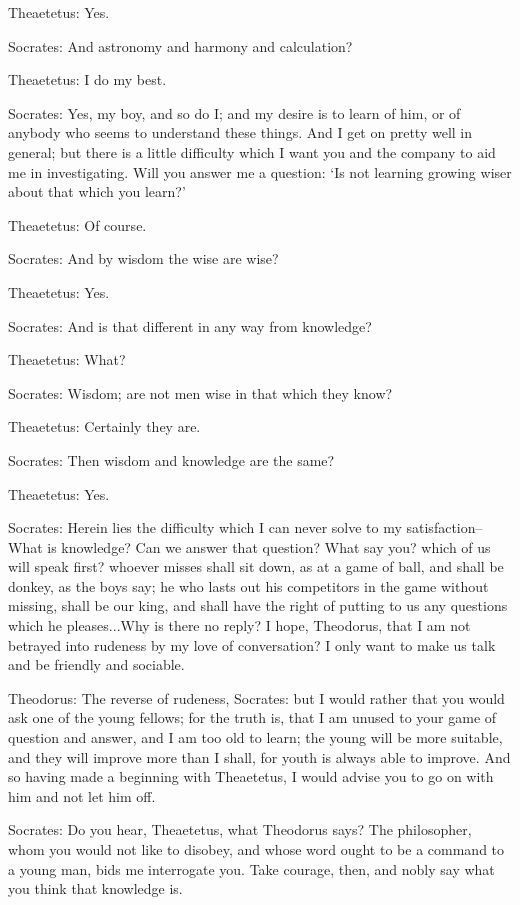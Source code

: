 Theaetetus: Yes.

Socrates: And astronomy and harmony and calculation?

Theaetetus: I do my best.

Socrates: Yes, my boy, and so do I; and my desire is to learn of him,
or of anybody who seems to understand these things. And I get on pretty
well in general; but there is a little difficulty which I want you and
the company to aid me in investigating. Will you answer me a question:
`Is not learning growing wiser about that which you learn?'

Theaetetus: Of course.

Socrates: And by wisdom the wise are wise?

Theaetetus: Yes.

Socrates: And is that different in any way from knowledge?

Theaetetus: What?

Socrates: Wisdom; are not men wise in that which they know?

Theaetetus: Certainly they are.

Socrates: Then wisdom and knowledge are the same?

Theaetetus: Yes.

Socrates: Herein lies the difficulty which I can never solve to my
satisfaction--What is knowledge? Can we answer that question? What say
you? which of us will speak first? whoever misses shall sit down, as at
a game of ball, and shall be donkey, as the boys say; he who lasts out
his competitors in the game without missing, shall be our king,
and shall have the right of putting to us any questions which he
pleases...Why is there no reply? I hope, Theodorus, that I am not
betrayed into rudeness by my love of conversation? I only want to make
us talk and be friendly and sociable.

Theodorus: The reverse of rudeness, Socrates: but I would rather that
you would ask one of the young fellows; for the truth is, that I am
unused to your game of question and answer, and I am too old to learn;
the young will be more suitable, and they will improve more than
I shall, for youth is always able to improve. And so having made a
beginning with Theaetetus, I would advise you to go on with him and not
let him off.

Socrates: Do you hear, Theaetetus, what Theodorus says? The philosopher,
whom you would not like to disobey, and whose word ought to be a command
to a young man, bids me interrogate you. Take courage, then, and nobly
say what you think that knowledge is.

